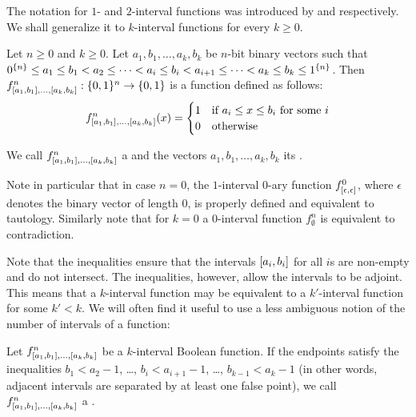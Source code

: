 The notation for $1$- and $2$-interval
functions was introduced by \citeauthor{Schieber2005154}
and \citeauthor{Dubovsky2012} respectively.
We shall generalize it to $k$-interval functions
for every $k \geq 0$.

\begin{definition}
\label{def:kibf}
Let $n \geq 0$ and $k \geq 0$.
Let $a_1, b_1, \ldots, a_k, b_k$ be $n$-bit binary vectors
such that $0^{\{n\}} \leq a_1 \leq b_1 < a_2
\leq \cdots < a_i \leq b_i < a_{i+1}
\leq \cdots < a_k \leq b_k \leq 1^{\{n\}}$.
Then $f^{n}_{[a_1, b_1], \ldots, [a_{k}, b_{k}]}: \{0, 1\}{}^n \rightarrow \{0, 1\}{}$ is a function defined as follows:
$$
f^{n}_{[a_1, b_1], \ldots, [a_{k}, b_{k}]}(x) =
\begin{cases}
1 & \text{if } a_i \leq x \leq b_i \text{ for some } i \\
0 & \text{otherwise}
\end{cases}
$$

We call
$f^n_{[a_1, b_1], \ldots, [a_k, b_k]}$
a 
and the vectors $a_1, b_1, \ldots, a_k, b_k$ its
.
\end{definition}

Note in particular that in case $n=0$,
the $1$-interval $0$-ary function
$f^{0}_{[\epsilon, \epsilon]}$,
where $\epsilon$ denotes the binary vector of length $0$,
is properly defined and equivalent to tautology.
Similarly note that for $k=0$
a $0$-interval function $f^n_{\emptyset}$
is equivalent to contradiction.

Note that the inequalities ensure
that the intervals $[a_i, b_i]$ for all $i$s
are non-empty and do not intersect.
The inequalities, however, allow the intervals to be adjoint.
This means that a $k$-interval function
may be equivalent to a $k'$-interval function
for some $k' < k$.
We will often find it useful to use a less ambiguous notion of the number of intervals of a function:
\begin{definition}
\label{def:properkibf}
Let
$f^n_{[a_1, b_1], \ldots, [a_k, b_k]}$
be a $k$-interval Boolean function.
If the endpoints satisfy the inequalities
$b_1 < a_2 - 1$, \ldots, $b_i < a_{i+1} - 1$, \ldots,
$b_{k-1} < a_k - 1$
(in other words, adjacent intervals
are separated by at least one false point),
we call
$f^n_{[a_1, b_1], \ldots, [a_k, b_k]}$
a .
\end{definition}

